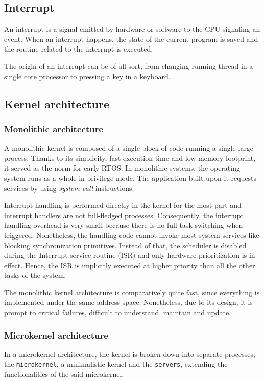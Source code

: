 \subsection{Interrupt}
An interrupt is a signal emitted by hardware or software to the CPU signaling an event.
When an interrupt happens, the state of the current program is saved 
    and the routine related to the interrupt is executed.

The origin of an interrupt can be of all sort, 
    from changing running thread in a single core processor to pressing a key in a keyboard.

\subsection{Kernel architecture\label{subsect:kernel-arch}}

\subsubsection{Monolithic architecture}
A monolithic kernel is composed of a single block of code running a single large process.
Thanks to its simplicity, fast execution time and low memory footprint, it served as the norm for early RTOS.
In monolithic systems, the operating system runs as a whole in privilege mode.
The application built upon it requests services by using \textit{system call} instructions.

Interrupt handling is performed directly in the kernel for the most part and interrupt handlers are not full-fledged processes.
Consequently, the interrupt handling overhead is very small because there is no full task switching when triggered.
Nonetheless, the handling code cannot invoke most system services like blocking synchronization primitives.
Instead of that, the scheduler is disabled during the Interrupt service routine (ISR) and only hardware prioritization is in effect.
Hence, the ISR is implicitly executed at higher priority than all the other tasks of the system.

The monolithic kernel architecture is comparatively quite fast, since ev\-ery\-thing is implemented under the same address space.
Nonetheless, due to its design, it is prompt to critical failures, difficult to understand, maintain and update\cite{OS_for_iot}\cite{comparison_iot_constrained_devices}.

\subsubsection{Microkernel architecture}
In a microkernel architecture, the kernel is broken down into separate processes;
     the \texttt{microkernel}, a minimalistic kernel
     and the \texttt{servers}, extending the functionalities of the said microkernel\cite{comparison_iot_constrained_devices}.

